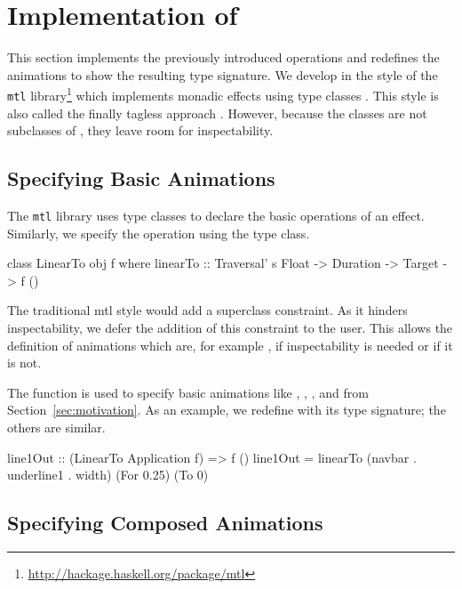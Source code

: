 \section{Implementation of \dsl{}}
\label{sec:detail}

This section implements the previously introduced operations and redefines the animations to show the resulting type signature. We
develop \dsl{} in the style of the \texttt{mtl}
library\footnote{\url{http://hackage.haskell.org/package/mtl}} which implements
monadic effects using type classes \cite{DBLP:conf/afp/Jones95}.  This style is
also called the finally tagless approach \cite{DBLP:journals/jfp/CaretteKS09}.
However, because the \dsl{} classes are not subclasses of , they leave
room for inspectability.

\subsection{Specifying Basic Animations}

The \texttt{mtl} library uses type classes to declare the basic operations of an
effect. Similarly, we specify the  operation using
the  type class.

\begin{code}
class LinearTo obj f where
  linearTo :: Traversal' s Float -> Duration -> Target -> f ()
\end{code}

The traditional mtl style would add a  superclass constraint. As 
it hinders inspectability, we defer the addition of this constraint to the user.
This allows the definition of animations which are, for example ,
if inspectability is needed or  if it is not.

The  function is used to specify basic
animations like , ,
, and  from
Section~\ref{sec:motivation}. 
As an example, we redefine  with its type signature; the others 
are similar. 

\begin{code}
line1Out :: (LinearTo Application f) => f ()
line1Out = linearTo (navbar . underline1 . width) (For 0.25) (To 0)
\end{code}

\subsection{Specifying Composed Animations}

